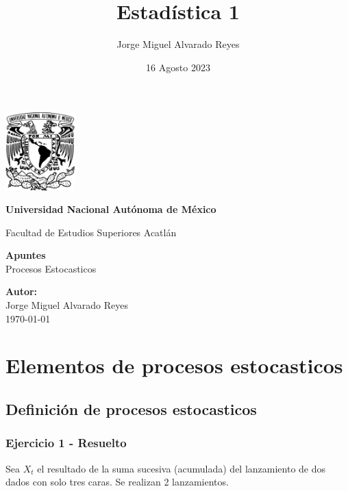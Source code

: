 \documentclass{article}
\title{Estadística 1}
\author{Jorge Miguel Alvarado Reyes}
\date{16 Agosto 2023}
\begin{document}
\begin{titlepage}
    \begin{center}
        \includegraphics[width=0.2\textwidth]{../../unam.png}
        \vspace*{.5cm}

        \LARGE
        \textbf{Universidad Nacional Autónoma de México}

        \vspace{0.5cm}
        \LARGE
        Facultad de Estudios Superiores Acatlán

        \vspace{2cm}

        \textbf{Apuntes} \\
        Procesos Estocasticos

        \vfill

        \vspace{1cm}

        \textbf{\large Autor:} \\
        Jorge Miguel Alvarado Reyes \\
        \vspace{.5cm}
        \normalsize \today

    \end{center}
\end{titlepage}
\newpage

\tableofcontents

\newpage

\section{Elementos de procesos estocasticos}

\subsection{Definición de procesos estocasticos}

\subsubsection{Ejercicio 1 - Resuelto}

Sea \(X_t\) el resultado de la suma sucesiva (acumulada) del lanzamiento de dos dados con solo tres caras. Se realizan 2 lanzamientos.
\end{document}
